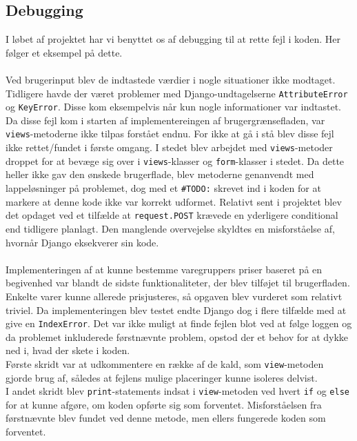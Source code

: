 \documentclass[]{article}
\begin{document}
\subsection{Debugging}
I løbet af projektet har vi benyttet os af debugging til at rette fejl i koden. Her følger et eksempel på dette. \\ \\
Ved brugerinput blev de indtastede værdier i nogle situationer ikke modtaget. Tidligere havde der været problemer med Django-undtagelserne \texttt{AttributeError} og \texttt{KeyError}. Disse kom eksempelvis når kun nogle informationer var indtastet. Da disse fejl kom i starten af implementereingen af brugergrænsefladen, var \texttt{views}-metoderne ikke tilpas forstået endnu. For ikke at gå i stå blev disse fejl ikke rettet/fundet i første omgang. I stedet blev arbejdet med \texttt{views}-metoder droppet for at bevæge sig over i \texttt{views}-klasser og \texttt{form}-klasser i stedet. Da dette heller ikke gav den ønskede brugerflade, blev metoderne genanvendt med lappeløsninger på problemet, dog med et \texttt{\#TODO:} skrevet ind i koden for at markere at denne kode ikke var korrekt udformet. Relativt sent i projektet blev det opdaget ved et tilfælde at \texttt{request.POST} krævede en yderligere conditional end tidligere planlagt. Den manglende overvejelse skyldtes en misforståelse af, hvornår Django eksekverer sin kode. \\ \\
Implementeringen af at kunne bestemme varegruppers priser baseret på en begivenhed var blandt de sidste funktionaliteter, der blev tilføjet til brugerfladen. Enkelte varer kunne allerede prisjusteres, så opgaven blev vurderet som relativt triviel. Da implementeringen blev testet endte Django dog i flere tilfælde med at give en \texttt{IndexError}. Det var ikke muligt at finde fejlen blot ved at følge loggen og da problemet inkluderede førstnævnte problem, opstod der et behov for at dykke ned i, hvad der skete i koden.\\
\indent Første skridt var at udkommentere en række af de kald, som \texttt{view}-metoden gjorde brug af, således at fejlens mulige placeringer kunne isoleres delvist. \\
\indent I andet skridt blev \texttt{print}-statements indsat i \texttt{view}-metoden ved hvert \texttt{if} og \texttt{else} for at kunne afgøre, om koden opførte sig som forventet. Misforståelsen fra førstnævnte blev fundet ved denne metode, men ellers fungerede koden som forventet. \\
\end{document}
